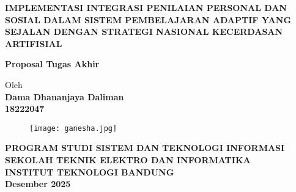 \documentclass[12pt,a4paper,oneside]{book}
\begin{document}
\begin{titlepage}
\begin{center}

    
    \vspace*{3cm}
    
    {\Large\bfseries\uppercase{Implementasi Integrasi Penilaian Personal dan Sosial dalam Sistem Pembelajaran Adaptif yang Sejalan dengan Strategi Nasional Kecerdasan Artifisial}}\\
     \vspace{2cm}

    {\Large \textbf{Proposal Tugas Akhir}}\\


    \vspace{1cm}
    
    
    {\large Oleh}\\[0.3cm]
    \textbf{
    {\large Dama Dhananjaya Daliman}\\
    {\large 18222047}
    }\\

    \vspace{2cm}
    
    \begin{figure}[h]
    \centering
    \texttt{[image: ganesha.jpg]}
    \end{figure}
    
    
     \vspace{1cm}

    \textbf{
    {\large PROGRAM STUDI SISTEM DAN TEKNOLOGI INFORMASI}\\
    {\large SEKOLAH TEKNIK ELEKTRO DAN INFORMATIKA}\\
    {\large INSTITUT TEKNOLOGI BANDUNG}\\
    {\large Desember 2025}
    }
\end{center}
\end{titlepage}
\end{document}
